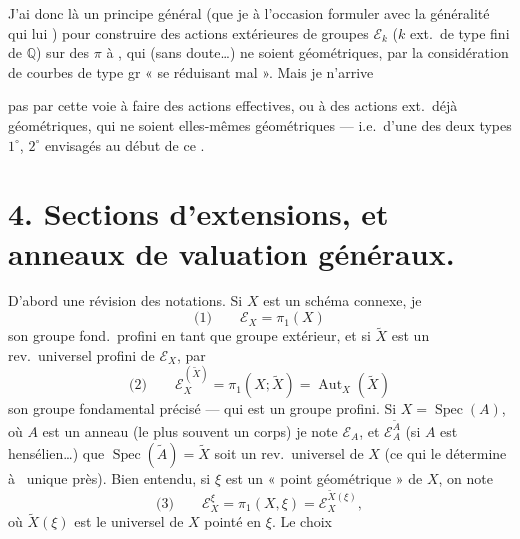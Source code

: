 \documentclass[11pt,a4paper]{article}
\begin{document}
J'ai donc là un principe général
(que je  à l'occasion formuler
avec la généralité qui lui ) pour
 \ill{}
construire des actions extérieures
de groupes $\mathcal{E}_k$ ($k$ ext.\ de type fini
de $\mathbb{Q}$) sur des $\pi$ à , qui
(sans doute…)
ne soient  géométriques, par  la
considération de courbes de type gr
« se réduisant mal ». Mais je n'arrive

pas par cette voie à faire des actions
effectives, ou  à \struck{\ill{}} des actions
ext.\ déjà géométriques, qui ne soient
elles-mêmes géométriques --- i.e.\ d'une
des deux types $1^{\circ}$, $2^{\circ}$ envisagés au
début de ce .

\section{4. Sections d'extensions, et anneaux de valuation généraux.}

D'abord une révision des notations. Si
$X$ est un schéma connexe, je  
\[
\text{(1)} \qquad \mathcal{E}_X = \pi_1(X)
\]
son groupe fond.\ profini en tant que
groupe extérieur, et si $\tilde{X}$ est un
rev.\ universel profini de $\mathcal{E}_X$, par
\[
\text{(2)} \qquad \mathcal{E}^{(\tilde{X})}_{X} = \pi_1(X ; \tilde{X}) = \operatorname{Aut}_X(\tilde{X})
\]
son groupe fondamental précisé --- qui est un
groupe profini. Si $X = \operatorname{Spec}(A)$, où $A$
est un anneau (le plus souvent
un corps) je note $\mathcal{E}_A$, et $\mathcal{E}^{\tilde{A}}_{A}$ (si $A$
est hensélien…)   \ill{}  que $\operatorname{Spec}(\tilde{A}) = \tilde{X}$
soit un rev.\ universel de $X$ (ce qui
le détermine à \ unique
près). Bien entendu, si $\xi$ est un
« point géométrique » de $X$, on note
\[
\text{(3)} \qquad \mathcal{E}^{\xi}_{X} = \pi_1(X, \xi) = \mathcal{E}^{\tilde{X}(\xi)}_{X} ,
\]
où $\tilde{X}(\xi)$ est le 
universel de $X$ pointé en $\xi$. Le choix
\end{document}
